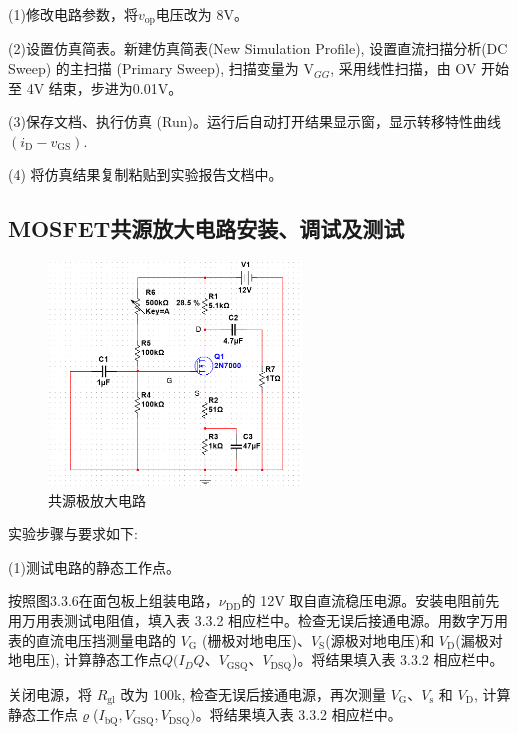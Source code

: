 \documentclass[a4paper,11pt,UTF8]{article}
\numberwithin{equation}{subsection}
\begin{document}
(1)修改电路参数，将$v_\mathrm{op}$电压改为 8V。

(2)设置仿真简表。新建仿真简表(New Simulation Profile), 设置直流扫描分析(DC Sweep)
的主扫描 (Primary Sweep), 扫描变量为 V$_{GG}$, 采用线性扫描，由 OV 开始至 4V 结束，步进为0.01V。

(3)保存文档、执行仿真 (Run)。运行后自动打开结果显示窗，显示转移特性曲线 $(i_\mathrm{D}-v_{\mathrm{GS}})$.

(4) 将仿真结果复制粘贴到实验报告文档中。

\subsection{MOSFET共源放大电路安装、调试及测试}
\begin{figure}[H]
	\centering
	\includegraphics[width=0.6\textwidth]{2.2}
	\caption{共源极放大电路}
\end{figure}

实验步骤与要求如下:

(1)测试电路的静态工作点。 

 按照图3.3.6在面包板上组装电路，$\nu_\mathrm{DD}$的 12V 取自直流稳压电源。安装电阻前先用万用表测试电阻值，填入表 3.3.2 相应栏中。检查无误后接通电源。用数字万用表的直流电压挡测量电路的 $V_\mathrm{G}$ (栅极对地电压)、$V_\mathrm{S}$(源极对地电压)和 $V_\mathrm{D}$(漏极对地电压), 计算静态工作点$Q(I_DQ$、$V_\mathrm{GSQ}$、$V_\mathrm{DSQ}$)。将结果填入表 3.3.2 相应栏中。

关闭电源，将 $R_\mathrm{gl}$ 改为 100k, 检查无误后接通电源，再次测量 $V_\mathrm{G}$、$V_\mathrm{s}$ 和 $V_\mathrm{D}$, 计算静态工作点$\varrho$($I_\mathrm{bQ},V_\mathrm{GSQ},V_\mathrm{DSQ})$。将结果填入表 3.3.2 相应栏中。
\end{document}
